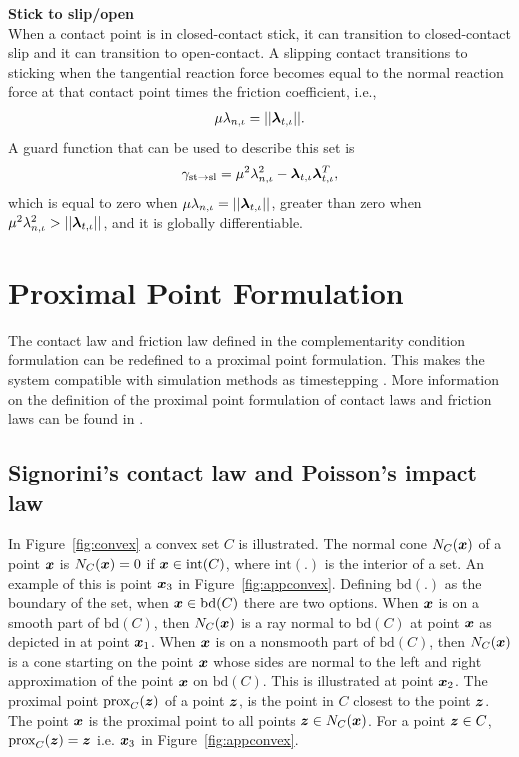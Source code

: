 \documentclass[../DC2017114Bouma.tex]{subfiles}
\begin{document}
\textbf{Stick to slip/open}\\
When a contact point is in closed-contact stick, it can transition to closed-contact slip and it can transition to open-contact. A slipping contact transitions to sticking when the tangential reaction force becomes equal to the normal reaction force at that contact point times the friction coefficient, i.e.,
\begin{align}
\mu\lambda_{n,\iota} = ||\boldsymbol{\lambda}_{t,\iota}||.
\end{align}
A guard function that can be used to describe this set is
\begin{align}
\gamma_{\text{st}\rightarrow\text{sl}} = \mu^2\lambda^2_{n,\iota} - \boldsymbol{\lambda}_{t,\iota}\boldsymbol{\lambda}_{t,\iota}^T,\label{eq:appguardstsl}
\end{align}
which is equal to zero when $\mu\lambda_{n,\iota} = ||\boldsymbol{\lambda}_{t,\iota}||$, greater than zero when $\mu^2\lambda^2_{n,\iota} > ||\boldsymbol{\lambda}_{t,\iota}||$, and it is globally differentiable. 

\section{Proximal Point Formulation}
The contact law and friction law defined in the complementarity condition formulation can be redefined to a proximal point formulation. This makes the system compatible with simulation methods as timestepping \cite[Chapter 10]{Acary2008}. More information on the definition of the proximal point formulation of contact laws and friction laws can be found in \cite[Section 5.3]{Leine2008}.

\subsection{Signorini's contact law and Poisson's impact law}
In Figure~\ref{fig:convex} a convex set $C$ is illustrated. The normal cone $N_C({\boldsymbol{x}})$ of a point ${\boldsymbol{x}}$ is $N_C({\boldsymbol{x}})=0$ if ${\boldsymbol{x}}\in \text{int}(C)$, where $\text{int}(.)$ is the interior of a set. An example of this is point ${\boldsymbol{x}}_3$ in Figure~\ref{fig:appconvex}. Defining $\text{bd}(.)$ as the boundary of the set, when ${\boldsymbol{x}}\in \text{bd}(C)$ there are two options. When ${\boldsymbol{x}}$ is on a smooth part of $\text{bd}(C)$, then $N_C({\boldsymbol{x}})$ is a ray normal to $\text{bd}(C)$ at point ${\boldsymbol{x}}$ as depicted in at point ${\boldsymbol{x}}_1$. When ${\boldsymbol{x}}$ is on a nonsmooth part of $\text{bd}(C)$, then $N_C({\boldsymbol{x}})$ is a cone starting on the point ${\boldsymbol{x}}$ whose sides are normal to the left and right approximation of the point ${\boldsymbol{x}}$ on $\text{bd}(C)$. This is illustrated at point ${\boldsymbol{x}}_2$. The proximal point $\operatorname{\text{prox}}_C({\boldsymbol{z}})$ of a point ${\boldsymbol{z}}$, is the point in $C$ closest to the point ${\boldsymbol{z}}$. The point ${\boldsymbol{x}}$ is the proximal point to all points  ${\boldsymbol{z}}\in N_C({\boldsymbol{x}})$. For a point ${\boldsymbol{z}}\in C$, $\operatorname{\text{prox}}_C({\boldsymbol{z}}) = {\boldsymbol{z}}$ i.e. ${\boldsymbol{x}}_3$ in Figure~\ref{fig:appconvex}.
\end{document}
